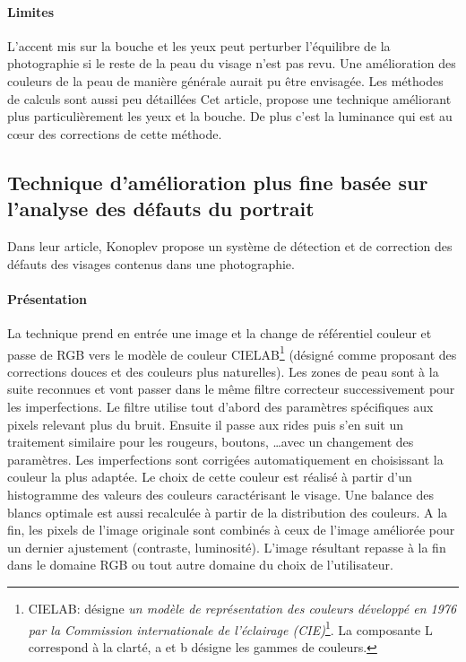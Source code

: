 \documentclass[11pt, french,screen]{report-rd-info}
\begin{document}
\paragraph{Limites}
L’accent mis sur la bouche et les yeux peut perturber l’équilibre de la photographie si le reste de la peau du visage n’est pas revu. Une amélioration des couleurs de la peau de manière générale aurait pu être envisagée. Les méthodes de calculs sont aussi peu détaillées
Cet article, propose une technique améliorant plus particulièrement les yeux et la bouche. De plus c’est la luminance qui est au cœur des corrections de cette méthode.
\subsection{Technique d’amélioration plus fine basée sur l’analyse des défauts du portrait}
Dans leur article, Konoplev\cite{Konoplev2012} propose un système de détection et de correction des défauts des visages contenus dans une photographie.
\paragraph{Présentation}
La technique prend en entrée une image et la change de référentiel couleur et passe de RGB vers le modèle de couleur CIELAB\footnote{CIELAB: désigne \textit{un modèle de représentation des couleurs développé en 1976 par la Commission internationale de l'éclairage (CIE)}\footnote{Wikipédia, CIELab,http://fr.wikipedia.org/wiki/CIE\_Lab}. La composante L correspond à la clarté, a et b désigne les gammes de couleurs.} (désigné comme proposant des corrections douces et des couleurs plus naturelles). Les zones de peau sont à la suite reconnues et vont passer dans le même filtre correcteur successivement pour les imperfections. Le filtre utilise tout d'abord des paramètres spécifiques aux pixels relevant plus du bruit. Ensuite il passe aux rides puis s'en suit un traitement similaire pour les rougeurs, boutons, \ldots avec un changement des paramètres. Les imperfections sont corrigées automatiquement en choisissant la couleur la plus adaptée. Le choix de cette couleur est réalisé à partir d’un histogramme des valeurs des couleurs caractérisant le visage. Une balance des blancs optimale est aussi recalculée à partir de la distribution des couleurs. A la fin, les pixels de l’image originale sont combinés à ceux de l’image améliorée pour un dernier ajustement (contraste, luminosité). L'image résultant repasse à la fin dans le domaine RGB ou tout autre domaine du choix de l’utilisateur.
\end{document}
